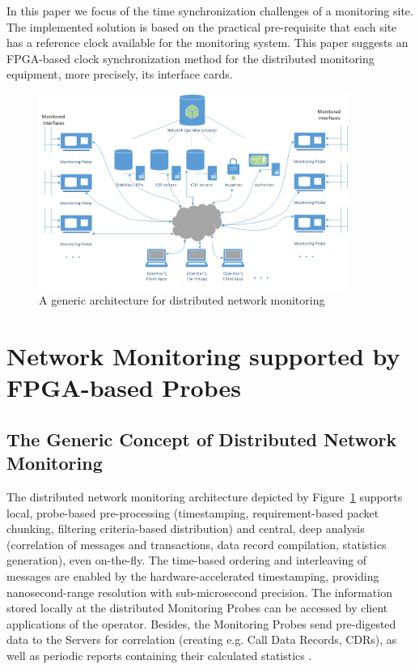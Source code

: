 \documentclass[journal]{IEEEtran}
\begin{document}
In this paper we focus of the time synchronization challenges of a monitoring site. The implemented solution is based on the practical pre-requisite that each site has a reference clock available for the monitoring system. This paper suggests an FPGA-based clock synchronization method for the distributed monitoring equipment, more precisely, its interface cards.

\begin{figure}[!htb]
    \centering
    \includegraphics[width=0.9\textwidth]{figures_raw/Network_monitoring.png}
    \caption{A generic architecture for distributed network monitoring}
    \label{fig:network_monitoring}
\end{figure}

\section{Network Monitoring supported by FPGA-based Probes}\label{sec:NetMon}
\subsection{The Generic Concept of Distributed Network Monitoring}

The distributed network monitoring architecture depicted by Figure~\ref{fig:network_monitoring} supports local, probe-based pre-processing (timestamping, requirement-based packet chunking, filtering criteria-based distribution) and central, deep analysis (correlation of messages and transactions, data record compilation, statistics generation), even on-the-fly. The time-based ordering and interleaving of messages are enabled by the hardware-accelerated timestamping, providing nanosecond-range resolution with sub-microsecond precision. The information stored locally at the distributed Monitoring Probes can be accessed by client applications of the operator. Besides, the Monitoring Probes send pre-digested data to the Servers for correlation (creating e.g. Call Data Records, CDRs), as well as periodic reports containing their calculated statistics \cite{Tatai_mobile_analysis}.
\end{document}
